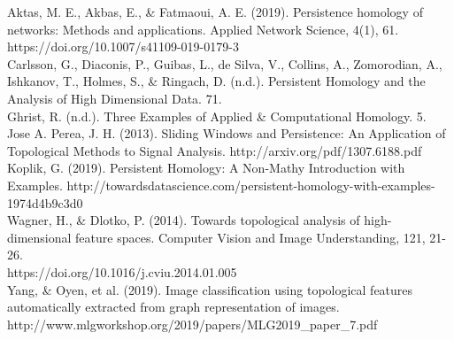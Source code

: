 \documentclass{article}
\begin{document}
Aktas, M. E., Akbas, E., \& Fatmaoui, A. E. (2019). Persistence homology of networks: Methods and applications. Applied Network Science, 4(1), 61. https://doi.org/10.1007/s41109-019-0179-3
\\[1em]
Carlsson, G., Diaconis, P., Guibas, L., de Silva, V., Collins, A., Zomorodian, A., Ishkanov, T., Holmes, S., \& Ringach, D. (n.d.). Persistent Homology and the Analysis of High Dimensional Data. 71.
\\[1em]
Ghrist, R. (n.d.). Three Examples of Applied \& Computational Homology. 5.
Jose A. Perea, J. H. (2013). Sliding Windows and Persistence: An Application of Topological Methods to Signal Analysis. http://arxiv.org/pdf/1307.6188.pdf
\\[1em]
Koplik, G. (2019). Persistent Homology: A Non-Mathy Introduction with Examples. http://towardsdatascience.com/persistent-homology-with-examples-1974d4b9c3d0
\\[1em]
Wagner, H., \& Dlotko, P. (2014). Towards topological analysis of high-dimensional feature spaces. Computer Vision and Image Understanding, 121, 21-26.\\https://doi.org/10.1016/j.cviu.2014.01.005
\\[1em]
Yang, \& Oyen,  et al. (2019). Image classification using topological features automatically extracted from graph representation of images.\\http://www.mlgworkshop.org/2019/papers/MLG2019\_paper\_7.pdf
\end{document}
